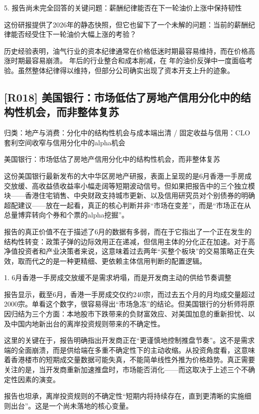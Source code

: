 \documentclass[11pt]{ctexart}
\begin{document}
5. 报告尚未完全回答的关键问题：薪酬纪律能否在下一轮油价上涨中保持韧性

这份研报提供了2026年的静态快照，但它也留下了一个未解的问题：当前的薪酬纪律能否经受住下一轮油价大幅上涨的考验？

历史经验表明，油气行业的资本纪律通常在价格低迷时期最容易维持，而在价格高涨时期最容易崩溃。 年后的行业整合和成本削减，在 年的油价反弹中一度面临考验。虽然整体纪律得以维持，但部分公司确实出现了资本开支上升的迹象。

\subsection{[R018] 美国银行：市场低估了房地产信用分化中的结构性机会，而非整体复苏}
{\small\color{refgray}归类：地产与消费：分化中的结构性机会与成本端出清 / 固定收益与信用：CLO套利空间收窄与信用分化中的alpha机会}

美国银行：市场低估了房地产信用分化中的结构性机会，而非整体复苏

这份美国银行最新发布的大中华区房地产研报，表面上呈现的是6月香港一手房成交放缓、高收益债收益率小幅走阔等短期波动信号。但如果把报告中的三个独立模块——香港住宅销售、中央财政支持城市更新、以及信用研究员对个别债券的明确超配建议——放在一起看，真正的核心判断并非“市场在变差”，而是“市场正在从总量博弈转向个券和个票的alpha挖掘”。

报告的真正价值不在于描述了6月的数据有多弱，而在于它指出了一个正在发生的结构性转变：政策子弹的边际效用正在递减，但信用主体的分化正在加速。对于高净值投资者和产业决策者来说，这意味着过去两年“买整个板块”的交易策略正在失效，取而代之的是一种更精细、更依赖主体信用判断的配置逻辑。

1. 6月香港一手房成交放缓不是需求坍塌，而是开发商主动的供给节奏调整

报告显示，截至6月，香港一手房成交仅约240宗，而过去五个月的月均成交量超过2000宗。单看这个数字，很容易得出“市场急冻”的结论。但美国银行的分析师将原因归结为三个方面：本地股市下跌带来的负财富效应、对美国加息的重新担忧、以及中国内地新出台的离岸投资规则带来的不确定性。

这里的关键在于，报告明确指出开发商正在“更谨慎地控制推盘节奏”。这不是需求端的全面崩溃，而是供给端在多重不确定性下的主动收缩。从投资角度看，这意味着香港楼市的短期成交量数据可能失真，不能简单线性外推为价格趋势。真正需要关注的是，当开发商重新加速推盘时，市场能否消化——而这取决于上述三个不确定性因素的演变。

报告也坦承，离岸投资规则的不确定性“短期内将持续存在，直到更清晰的实施细则出台”。这是一个尚未落地的核心变量。
\end{document}
